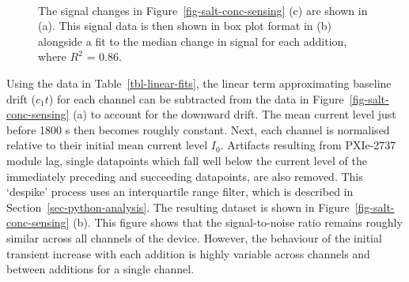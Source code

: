 \documentclass[
  letterpaper,
  DIV=11,
  numbers=noendperiod]{scrartcl}
\begin{document}
\begin{figure}
\begin{minipage}[t]{0.65\linewidth}
{{}

}

\end{minipage}%
%
\begin{minipage}[t]{0.17\linewidth}

{\centering 

~

}

\end{minipage}%

\caption{\label{fig-salt-conc-signal}The signal changes in
Figure~\ref{fig-salt-conc-sensing} (c) are shown in (a). This signal
data is then shown in box plot format in (b) alongside a fit to the
median change in signal for each addition, where \(R^2\) = 0.86.}

\end{figure}

Using the data in Table~\ref{tbl-linear-fits}, the linear term
approximating baseline drift (\(c_1t\)) for each channel can be
subtracted from the data in Figure~\ref{fig-salt-conc-sensing} (a) to
account for the downward drift. The mean current level just before 1800
s then becomes roughly constant. Next, each channel is normalised
relative to their initial mean current level \(I_{0}\). Artifacts
resulting from PXIe-2737 module lag, single datapoints which fall well
below the current level of the immediately preceding and succeeding
datapoints, are also removed. This `despike' process uses an
interquartile range filter, which is described in
Section~\ref{sec-python-analysis}. The resulting dataset is shown in
Figure~\ref{fig-salt-conc-sensing} (b). This figure shows that the
signal-to-noise ratio remains roughly similar across all channels of the
device. However, the behaviour of the initial transient increase with
each addition is highly variable across channels and between additions
for a single channel.
\end{document}
